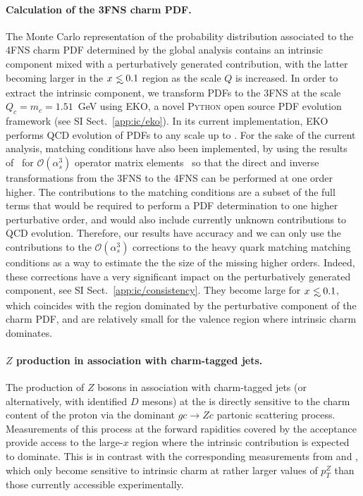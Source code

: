 \paragraph{Calculation of the 3FNS charm PDF.}
%
The Monte Carlo representation of the probability distribution associated to
the 4FNS charm PDF determined by the global
analysis contains an intrinsic component mixed with a perturbatively
generated contribution, with the latter
becoming larger in the $x\lsim 0.1$ region as the scale $Q$ is increased.
%
In order to extract the intrinsic component, 
we transform PDFs to the 3FNS at the scale $Q_c=m_c=1.51$~GeV using
\textsc{\small EKO}, a novel \textsc{\small Python} open source
PDF evolution framework (see  SI Sect.~\ref{app:ic/eko}).
%
In its current implementation, \textsc{\small EKO} performs  QCD 
evolution of PDFs to any scale
up to \nnlo. For
the sake of the current analysis, \nnnlo matching conditions have also
been implemented, by 
using  the results
of~\cite{Bierenbaum:2009zt,Bierenbaum:2009mv,Ablinger:2010ty,Ablinger:2014vwa,Ablinger:2014uka,Behring:2014eya,Ablinger_2014,Ablinger:2014nga,Blumlein:2017wxd}
for $\mathcal{O}(\alpha_s^3)$ operator matrix elements~
so that the direct and inverse transformations from the 3FNS to the
4FNS can be performed at one order
higher.
%
The \nnnlo contributions to the matching conditions are a subset of
the full \nnnlo terms that would be required to perform a PDF determination
 to one higher perturbative order, and would
also include currently unknown
\nnnlo contributions to QCD evolution. Therefore, our results have 
\nnlo accuracy and we can only use the  \nnnlo contributions to the
 $\mathcal{O}(\alpha_s^3)$ corrections to the
heavy quark matching
matching conditions as a way to estimate the 
the size of the missing higher orders. 
Indeed, these corrections have a very 
significant impact on the
perturbatively generated component, see SI Sect.~\ref{app:ic/consistency}.
%
They become large for $x \lsim 0.1$, which coincides with the region
dominated by the perturbative component of the charm PDF,
  and are relatively small for the valence region
  where intrinsic charm dominates.
  
\paragraph{$Z$ production in association with charm-tagged jets.}
%
The production of $Z$ bosons in association with charm-tagged jets (or alternatively,
with identified $D$ mesons) at the \lhc is directly sensitive to the charm content
of the proton via the dominant $gc \to Zc$ partonic scattering process.
%
Measurements of this process at  the forward rapidities covered by the
\lhcb acceptance provide access to the large-$x$ region where the intrinsic 
contribution is expected to dominate.
%
This is in contrast with the corresponding measurements from \atlas and \cms,
which only become sensitive to intrinsic charm
at rather larger values of $p_T^Z$ than those
currently accessible experimentally.


